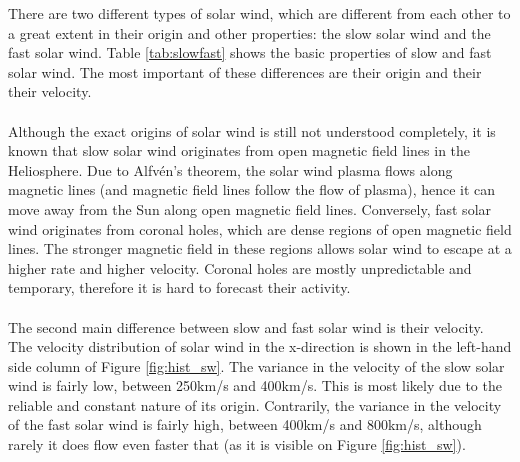 \documentclass[12pt]{article}
\begin{document}
        There are two different types of solar wind, which are different from each other to a great extent in their origin and other properties: the slow solar wind and the fast solar wind. Table \ref{tab:slowfast} shows the basic properties of slow and fast solar wind. The most important of these differences are their origin and their their velocity.\\ \\
        Although the exact origins of solar wind is still not understood completely, it is known that slow solar wind originates from open magnetic field lines in the Heliosphere. Due to Alfvén's theorem\cite{1976alfven}, the solar wind plasma flows along magnetic lines (and magnetic field lines follow the flow of plasma), hence it can move away from the Sun along open magnetic field lines. Conversely, fast solar wind originates from coronal holes, which are dense regions of open magnetic field lines. The stronger magnetic field in these regions allows solar wind to escape at a higher rate and higher velocity. Coronal holes are mostly unpredictable and temporary, therefore it is hard to forecast their activity.\\ \\
        The second main difference between slow and fast solar wind is their velocity. The velocity distribution of solar wind in the x-direction is shown in the left-hand side column of Figure \ref{fig:hist_sw}. The variance in the velocity of the slow solar wind is fairly low, between 250km/s and 400km/s. This is most likely due to the reliable and constant nature of its origin. Contrarily, the variance in the velocity of the fast solar wind is fairly high, between 400km/s and 800km/s, although rarely it does flow even faster that (as it is visible on Figure \ref{fig:hist_sw}).\\
\end{document}
